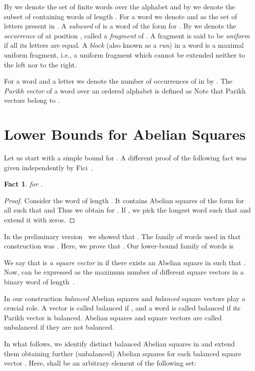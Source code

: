\documentclass{article}
\theoremstyle{plain}
\newtheorem{fact}[theorem]{Fact}
\theoremstyle{definition}
\theoremstyle{remark}
\begin{document}
  By  we denote the set of finite words over the alphabet  and by
   we denote the subset of  containing words of length .
  For a word  we denote  and  as the set of letters present in .
  A \emph{subword} of  is a word of the form  for .
  By  we denote the \emph{occurrence} of  at position , called a \emph{fragment}
  of . 
  A fragment is said to be \emph{uniform} if all its letters are equal.
  A \emph{block} (also known as a \emph{run}) in a word is a maximal uniform fragment, i.e.,
  a uniform fragment which cannot be extended neither to the left nor to the right.
  
  For a word  and a letter  we denote the number of occurrences of  in  by .
  The \emph{Parikh vector} of a word  over an ordered alphabet 
  is defined as 
  Note that Parikh vectors belong to .
    

  \section{Lower Bounds for Abelian Squares}\label{sec:lower}
  Let us start with a simple bound for .
  A different proof of the following fact was given independently by Fici~\cite{Fici}.

  \begin{fact}{\label{fct:sq-ab-lower-bound}}
     for .
  \end{fact}
  \begin{proof}
    Consider the word  of length .
    It contains  Abelian squares of the form
     for all  such that  and 
    Thus we obtain  for .
    If , we pick the longest word  such that 
    and extend it with  zeros.
  \end{proof}

  In the preliminary version~\cite{DBLP:conf/dlt/KociumakaRRW14} we showed that .
  The family of words used in that construction was .
  Here, we prove that .
  Our lower-bound family of words is
  
  
  We say that  is \emph{a square vector} in 
  if there exists an Abelian square  in  such that
  .
  Now,  can be expressed as the maximum number of different square vectors in a binary word of length~.

  In our construction \emph{balanced} Abelian squares
  and \emph{balanced} square vectors play a crucial role.
  A vector  is called balanced if , and a word  is called
  balanced if its Parikh vector is balanced.
  Abelian squares and square vectors are called unbalanced if they are not balanced.

  In what follows, we identify  distinct balanced Abelian squares in  and extend them 
  obtaining further  (unbalanced) Abelian squares for each balanced square vector .
  Here,  shall be an arbitrary element of the following set:
  
\end{document}
